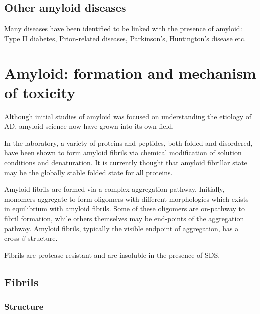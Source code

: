 \subsection{Other amyloid diseases}
Many diseases have been identified to be linked with the presence of amyloid: Type II diabetes, Prion-related diseases, Parkinson's, Huntington's disease etc.


\section{Amyloid: formation and mechanism of toxicity}
  \begin{outline}[enumerate]
    \1 Although initial studies of amyloid was focused on understanding the etiology of AD, amyloid science now have grown into its own field.

    \1 In the laboratory, a variety of proteins and peptides, both folded and disordered, have been shown to form amyloid fibrils via chemical modification of solution conditions and denaturation. It is currently thought that amyloid fibrillar state may be the globally stable folded state for all proteins.

    \1 Amyloid fibrils are formed via a complex aggregation pathway. Initially, monomers aggregate to form oligomers with different morphologies which exists in equilibrium with amyloid fibrils. Some of these oligomers are on-pathway to fibril formation, while others themselves may be end-points of the aggregation pathway. Amyloid fibrils, typically the visible endpoint of aggregation, has a cross-$\beta$ structure.
    
    \1 Fibrils are protease resistant and are insoluble in the presence of SDS.
  \end{outline}

 \subsection{Fibrils}
    \subsubsection{Structure} %
    \label{ssub:structure}

